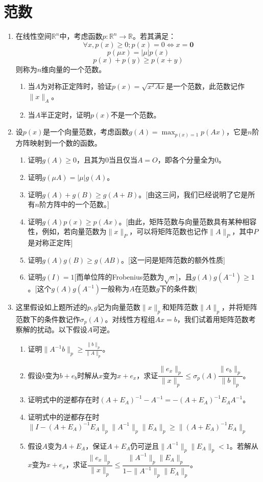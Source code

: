 \documentclass[a4paper,UTF8,fontset=windows]{ctexart}
\begin{document}
\section{范数}
\begin{enumerate}
    \item 在线性空间$\mathbb{R}^n$中，考虑函数$p:\mathbb{R}^n\to\mathbb{R}$。若其满足：
    $$\forall x,p(x)\ge0;p(x)=0\Leftrightarrow x=\mathbf{0}$$
    $$p(\mu x)=|\mu|p(x)$$
    $$p(x)+p(y)\ge p(x+y)$$
    则称为$n$维向量的一个范数。
    \begin{enumerate}
        \item 当$A$为对称正定阵时，验证$p(x)=\sqrt{x^TAx}$是一个范数，此范数记作$\|x\|_A$。
        \item 当$A$半正定时，证明$p(x)$不是一个范数。
    \end{enumerate}

    \item 设$p(x)$是一个向量范数，考虑函数$g(A)=\max_{p(x)=1}p(Ax)$，它是$n$阶方阵映射到一个数的函数。
    \begin{enumerate}
        \item 证明$g(A)\ge0$，且其为0当且仅当$A=O$，即各个分量全为0。
        \item 证明$g(\mu A)=|\mu|g(A)$。
        \item 证明$g(A)+g(B)\ge g(A+B)$。[由这三问，我们已经说明了它是所有$n$阶方阵中的一个范数。]
        \item 证明$g(A)p(x)\ge p(Ax)$。[由此，矩阵范数与向量范数具有某种相容性，例如，若向量范数为$\|x\|_P$，可以将矩阵范数也记作$\|A\|_P$，其中$P$是对称正定阵]
        \item 证明$g(A)g(B)\ge g(AB)$。[这一问是矩阵范数的额外性质] 
        \item 证明$g(I)=1$[而单位阵的Frobenius范数为$\sqrt{n}$]，且$g(A)g(A^{-1})\ge1$。[这个$g(A)g(A^{-1})$一般称为$A$在范数$g$下的条件数]
    \end{enumerate}

    \item 这里假设如上题所述的$p,g$记为向量范数$\|x\|_p$和矩阵范数$\|A\|_p$，并将矩阵范数下的条件数记作$\sigma_p(A)$。对线性方程组$Ax=b$，我们试着用矩阵范数考察解的扰动。以下假设$A$可逆。
    \begin{enumerate}
        \item 证明$\|A^{-1}b\|_p\ge\frac{\|b\|_p}{\|A\|_p}$。
        \item 假设$b$变为$b+e_b$时解从$x$变为$x+e_x$，求证$\dfrac{\|e_x\|_p}{\|x\|_p}\le\sigma_p(A)\dfrac{\|e_b\|_p}{\|b\|_p}$。
        \item 证明式中的逆都存在时$(A+E_A)^{-1}-A^{-1}=-(A+E_A)^{-1}E_AA^{-1}$。
        \item 证明式中的逆都存在时$\|I-(A+E_A)^{-1}E_A\|_p\|A^{-1}\|_p\|E_A\|_p\ge\|(A+E_A)^{-1}E_A\|_p$
        \item 假设$A$变为$A+E_A$，保证$A+E_A$仍可逆且$\|A^{-1}\|_p\|E_A\|_p<1$。若解从$x$变为$x+e_x$，求证$\dfrac{\|e_x\|_p}{\|x\|_p}\le\dfrac{\|A^{-1}\|_p\|E_A\|_p}{1-\|A^{-1}\|_p\|E_A\|_p}$。
    \end{enumerate}
\end{enumerate}
\end{document}
